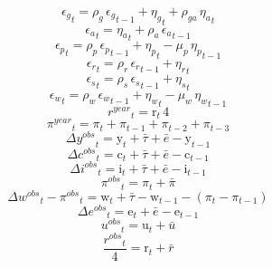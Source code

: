 \begin{dmath}
{{\epsilon_{g}}}_{t}={{\rho_{g}}}\, {{\epsilon_{g}}}_{t-1}+{{\eta_{g}}}_{t}+{{\rho_{ga}}}\, {{\eta_{a}}}_{t}
\end{dmath}
\begin{dmath}
{{\epsilon_{a}}}_{t}={{\eta_{a}}}_{t}+{{\rho_{a}}}\, {{\epsilon_{a}}}_{t-1}
\end{dmath}
\begin{dmath}
{{\epsilon_{p}}}_{t}={{\rho_{p}}}\, {{\epsilon_{p}}}_{t-1}+{{\eta_{p}}}_{t}-{{\mu_{p}}}\, {{\eta_{p}}}_{t-1}
\end{dmath}
\begin{dmath}
{{\epsilon_{r}}}_{t}={{\rho_{r}}}\, {{\epsilon_{r}}}_{t-1}+{{\eta_{r}}}_{t}
\end{dmath}
\begin{dmath}
{{\epsilon_{s}}}_{t}={{\rho_{s}}}\, {{\epsilon_{s}}}_{t-1}+{{\eta_{s}}}_{t}
\end{dmath}
\begin{dmath}
{{\epsilon_{w}}}_{t}={{\rho_{w}}}\, {{\epsilon_{w}}}_{t-1}+{{\eta_{w}}}_{t}-{{\mu_{w}}}\, {{\eta_{w}}}_{t-1}
\end{dmath}
\begin{dmath}
{{r^{year}}}_{t}={{\mathrm{r}}}_{t}\, 4
\end{dmath}
\begin{dmath}
{{\pi^{year}}}_{t}={{\pi}}_{t}+{{\pi}}_{t-1}+{{\pi}}_{t-2}+{{\pi}}_{t-3}
\end{dmath}
\begin{dmath}
{{\Delta y^{obs}}}_{t}={{\mathrm{y}}}_{t}+{{\bar{\tau}}}+{{\bar{e}}}-{{\mathrm{y}}}_{t-1}
\end{dmath}
\begin{dmath}
{{\Delta c^{obs}}}_{t}={{\mathrm{c}}}_{t}+{{\bar{\tau}}}+{{\bar{e}}}-{{\mathrm{c}}}_{t-1}
\end{dmath}
\begin{dmath}
{{\Delta i^{obs}}}_{t}={{\mathrm{i}}}_{t}+{{\bar{\tau}}}+{{\bar{e}}}-{{\mathrm{i}}}_{t-1}
\end{dmath}
\begin{dmath}
{{\pi^{obs}}}_{t}={{\pi}}_{t}+{{\bar{\pi}}}
\end{dmath}
\begin{dmath}
{{\Delta w^{obs}}}_{t}-{{\pi^{obs}}}_{t}={{\mathrm{w}}}_{t}+{{\bar{\tau}}}-{{\mathrm{w}}}_{t-1}-\left({{\pi}}_{t}-{{\pi}}_{t-1}\right)
\end{dmath}
\begin{dmath}
{{\Delta e^{obs}}}_{t}={{\mathrm{e}}}_{t}+{{\bar{e}}}-{{\mathrm{e}}}_{t-1}
\end{dmath}
\begin{dmath}
{{u^{obs}}}_{t}={{\mathrm{u}}}_{t}+{{\bar{u}}}
\end{dmath}
\begin{dmath}
\frac{{{r^{obs}}}_{t}}{4}={{\mathrm{r}}}_{t}+{{\bar{r}}}
\end{dmath}
